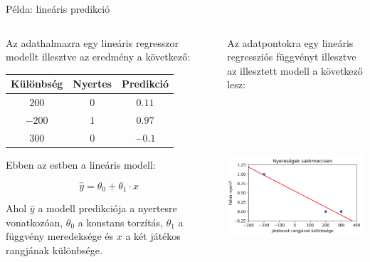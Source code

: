 \documentclass[english, aspectratio=169]{beamer}
\begin{document}
\begin{frame}{Példa: lineáris predikció}
\begin{columns}
\begin{column}{.5\textwidth}
Az adathalmazra egy lineáris regresszor modellt illesztve az eredmény a következő:\par\smallskip
\begin{center}
\begin{tabular}{|c|c|c|}
\hline
Különbség & Nyertes & Predikció\\
\hline
$200$ & $0$ & $0.11$\\
\hline
$-200$ & $1$ & $0.97$\\
\hline
$300$ & $0$ & $-0.1$\\
\hline
\end{tabular}
\par\medskip
\end{center}
Ebben az estben a lineáris modell:
\begin{block}{}
\vspace{-0.25cm}
\[
\hat{y} = \theta_0 + \theta_1 \cdot x
\]
\end{block}
Ahol $\hat{y}$ a modell predikciója a nyertesre vonatkozóan, $\theta_0$ a konstans torzítás, $\theta_1$ a függvény meredeksége és $x$ a két játékos rangjának különbsége.
\end{column}
\begin{column}{.5\textwidth}
Az adatpontokra egy lineáris regressziós függvényt illesztve az illesztett modell a következő lesz:\par\smallskip
\begin{center}
\includegraphics[width=7cm, height=7cm, keepaspectratio]{images/osztalyozas_13.png}
\end{center}
\end{column}
\end{columns}
\end{frame}
\end{document}
